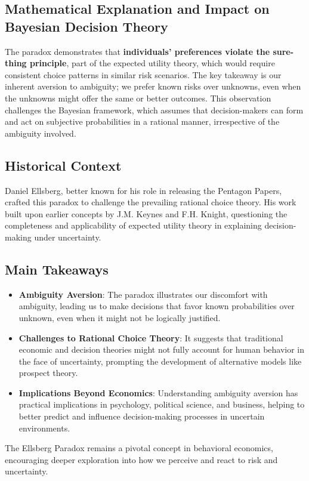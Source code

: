 \documentclass{article}
\begin{document}
\subsection{Mathematical Explanation and Impact on Bayesian Decision Theory}
The paradox demonstrates that \textbf{individuals' preferences violate the sure-thing principle}, part of the expected utility theory, which would require consistent choice patterns in similar risk scenarios. The key takeaway is our inherent aversion to ambiguity; we prefer known risks over unknowns, even when the unknowns might offer the same or better outcomes. This observation challenges the Bayesian framework, which assumes that decision-makers can form and act on subjective probabilities in a rational manner, irrespective of the ambiguity involved.

\subsection{Historical Context}
Daniel Ellsberg, better known for his role in releasing the Pentagon Papers, crafted this paradox to challenge the prevailing rational choice theory. His work built upon earlier concepts by J.M. Keynes and F.H. Knight, questioning the completeness and applicability of expected utility theory in explaining decision-making under uncertainty.

\subsection{Main Takeaways}
\begin{itemize}
    \item \textbf{Ambiguity Aversion}: The paradox illustrates our discomfort with ambiguity, leading us to make decisions that favor known probabilities over unknown, even when it might not be logically justified.
    \item \textbf{Challenges to Rational Choice Theory}: It suggests that traditional economic and decision theories might not fully account for human behavior in the face of uncertainty, prompting the development of alternative models like prospect theory.
    \item \textbf{Implications Beyond Economics}: Understanding ambiguity aversion has practical implications in psychology, political science, and business, helping to better predict and influence decision-making processes in uncertain environments.
\end{itemize}

The Ellsberg Paradox remains a pivotal concept in behavioral economics, encouraging deeper exploration into how we perceive and react to risk and uncertainty. 
\end{document}
